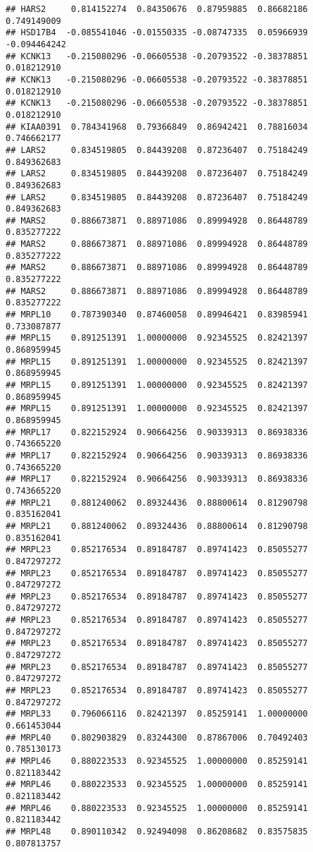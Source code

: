 \documentclass[
]{article}
\begin{document}
\begin{verbatim}
## HARS2     0.814152274  0.84350676  0.87959885  0.86682186  0.749149009
## HSD17B4  -0.085541046 -0.01550335 -0.08747335  0.05966939 -0.094464242
## KCNK13   -0.215080296 -0.06605538 -0.20793522 -0.38378851  0.018212910
## KCNK13   -0.215080296 -0.06605538 -0.20793522 -0.38378851  0.018212910
## KCNK13   -0.215080296 -0.06605538 -0.20793522 -0.38378851  0.018212910
## KIAA0391  0.784341968  0.79366849  0.86942421  0.78816034  0.746662177
## LARS2     0.834519805  0.84439208  0.87236407  0.75184249  0.849362683
## LARS2     0.834519805  0.84439208  0.87236407  0.75184249  0.849362683
## LARS2     0.834519805  0.84439208  0.87236407  0.75184249  0.849362683
## MARS2     0.886673871  0.88971086  0.89994928  0.86448789  0.835277222
## MARS2     0.886673871  0.88971086  0.89994928  0.86448789  0.835277222
## MARS2     0.886673871  0.88971086  0.89994928  0.86448789  0.835277222
## MARS2     0.886673871  0.88971086  0.89994928  0.86448789  0.835277222
## MRPL10    0.787390340  0.87460058  0.89946421  0.83985941  0.733087877
## MRPL15    0.891251391  1.00000000  0.92345525  0.82421397  0.868959945
## MRPL15    0.891251391  1.00000000  0.92345525  0.82421397  0.868959945
## MRPL15    0.891251391  1.00000000  0.92345525  0.82421397  0.868959945
## MRPL15    0.891251391  1.00000000  0.92345525  0.82421397  0.868959945
## MRPL17    0.822152924  0.90664256  0.90339313  0.86938336  0.743665220
## MRPL17    0.822152924  0.90664256  0.90339313  0.86938336  0.743665220
## MRPL17    0.822152924  0.90664256  0.90339313  0.86938336  0.743665220
## MRPL21    0.881240062  0.89324436  0.88800614  0.81290798  0.835162041
## MRPL21    0.881240062  0.89324436  0.88800614  0.81290798  0.835162041
## MRPL23    0.852176534  0.89184787  0.89741423  0.85055277  0.847297272
## MRPL23    0.852176534  0.89184787  0.89741423  0.85055277  0.847297272
## MRPL23    0.852176534  0.89184787  0.89741423  0.85055277  0.847297272
## MRPL23    0.852176534  0.89184787  0.89741423  0.85055277  0.847297272
## MRPL23    0.852176534  0.89184787  0.89741423  0.85055277  0.847297272
## MRPL23    0.852176534  0.89184787  0.89741423  0.85055277  0.847297272
## MRPL23    0.852176534  0.89184787  0.89741423  0.85055277  0.847297272
## MRPL33    0.796066116  0.82421397  0.85259141  1.00000000  0.661453044
## MRPL40    0.802903829  0.83244300  0.87867006  0.70492403  0.785130173
## MRPL46    0.880223533  0.92345525  1.00000000  0.85259141  0.821183442
## MRPL46    0.880223533  0.92345525  1.00000000  0.85259141  0.821183442
## MRPL46    0.880223533  0.92345525  1.00000000  0.85259141  0.821183442
## MRPL48    0.890110342  0.92494098  0.86208682  0.83575835  0.807813757

\end{verbatim}
\end{document}
